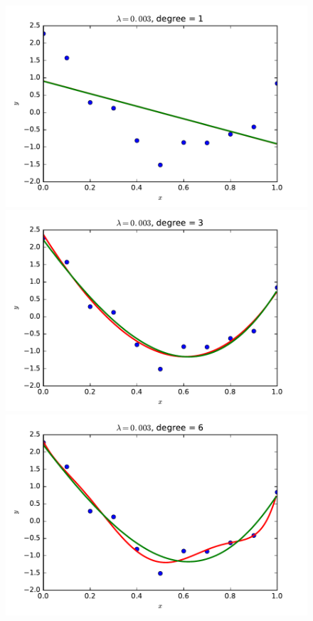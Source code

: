 \documentclass{article}
\begin{document}
\begin{multicols}{2}
\begin{figure}[p] %
   \centering
   \newlength{\picwidth}
   \setlength{\picwidth}{2in}
   \includegraphics[width=\picwidth]{img/3-1_ridge_lambd3_degree1.pdf}
   \includegraphics[width=\picwidth]{img/3-1_ridge_lambd3_degree3.pdf}
   \includegraphics[width=\picwidth]{img/3-1_ridge_lambd3_degree6.pdf}

\end{figure}
\end{multicols}
\end{document}
